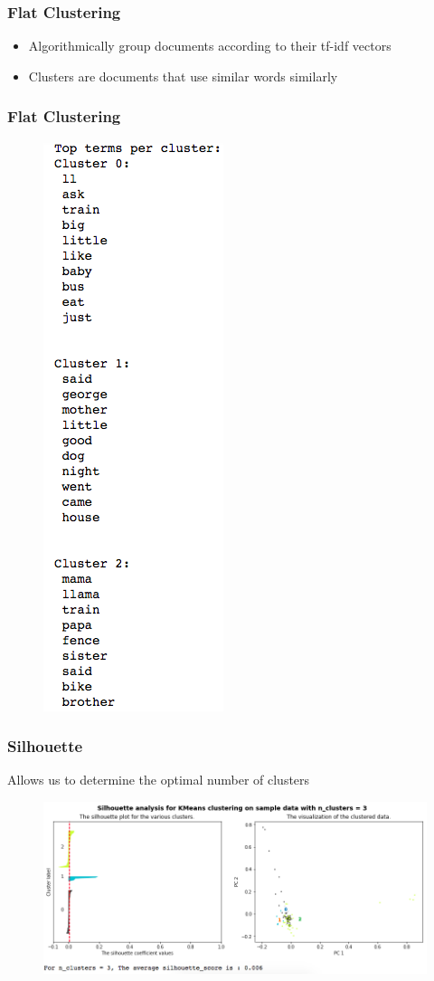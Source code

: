 \documentclass{beamer}
\begin{document}
\begin{frame}
	\frametitle{Flat Clustering}
	\begin{itemize}
		\item Algorithmically group documents according to their tf-idf vectors
		\item Clusters are documents that use similar words similarly 
	\end{itemize}
\end{frame}

\begin{frame}
	\frametitle{Flat Clustering}
		\begin{figure}
			\includegraphics[width=0.2\linewidth]{clusterterms.png}
		\end{figure}
	
\end{frame}
\begin{frame}
	\frametitle{Silhouette}
	Allows us to determine the optimal number of clusters
	\begin{figure}
		\includegraphics[width=1.0\linewidth]{silhouette3.png}
	\end{figure}
\end{frame}
\end{document}

